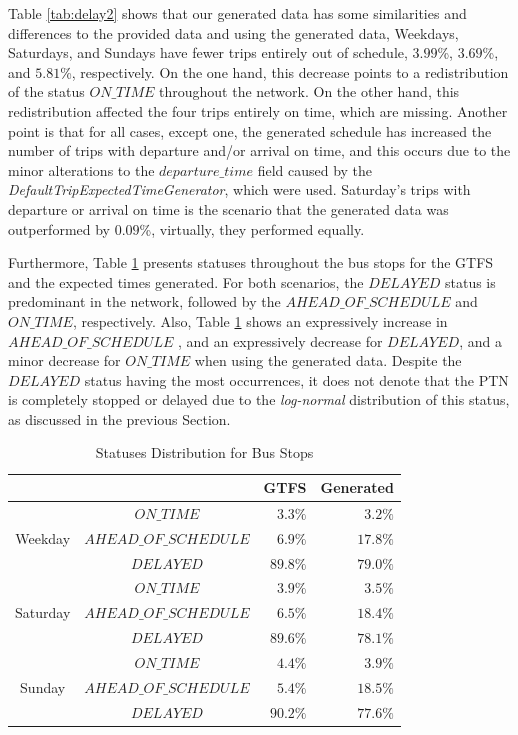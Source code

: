 Table \ref{tab:delay2} shows that our generated data has some similarities and differences to the provided data and
using the generated data, Weekdays, Saturdays, and Sundays have fewer trips entirely out of schedule, $3.99$\%, $3.69$\%, and
$5.81$\%, respectively. 
On the one hand, this decrease points to a redistribution of the status $ON\_TIME$ throughout the network. %
On the other hand, this redistribution affected the four trips entirely on time, which are missing. 
Another point is that for all cases, except one, the generated schedule has
increased the number of trips with departure and/or arrival on time, and this occurs due to the minor alterations to the 
$departure\_time$ field caused by the \textit{DefaultTripExpectedTimeGenerator}, which were used. 
Saturday's trips with departure or arrival on time is the scenario that the generated data was outperformed by $0.09$\%,
virtually, they performed equally. 

Furthermore, Table \ref{tab:delaydistribution} presents statuses throughout the bus stops for the GTFS and the expected times
generated. For both scenarios, the $DELAYED$ status is predominant in the network, followed by the $AHEAD\_OF\_SCHEDULE$ and
$ON\_TIME$, respectively. Also, Table \ref{tab:delaydistribution} shows an expressively increase in $AHEAD\_OF\_SCHEDULE$
, and an expressively decrease for $DELAYED$, and a minor decrease for $ON\_TIME$ when using the generated data. 
Despite the $DELAYED$ status having the most occurrences, it does not denote that the PTN is completely stopped or delayed due to the
{\em log-normal} distribution of this status, as discussed in the previous Section.

\begin{table}[h!]
\centering
\caption{Statuses Distribution for Bus Stops}
\begin{tabular}{|c|c|c|r|r|}
\hline
\multicolumn{3}{|c|}{} &   GTFS  &  Generated  \\
\hline
 \multirow{3}{*}{Weekday} & \multicolumn{2}{|c|}{$ON\_TIME$} & $3.3\%$ & $3.2\%$ \\\cline{2-5}
 & \multicolumn{2}{|c|}{$AHEAD\_OF\_SCHEDULE$} & $6.9\%$ & $17.8\%$ \\\cline{2-5}
 & \multicolumn{2}{|c|}{$DELAYED$} &$89.8\%$ & $79.0\%$  \\
\hline
 \multirow{3}{*}{Saturday} & \multicolumn{2}{|c|}{$ON\_TIME$} & $3.9\%$ & $3.5\%$ \\\cline{2-5}
 & \multicolumn{2}{|c|}{$AHEAD\_OF\_SCHEDULE$} & $6.5\%$ & $18.4\%$ \\\cline{2-5}
 & \multicolumn{2}{|c|}{$DELAYED$} &$89.6\%$ & $78.1\%$  \\
\hline
 \multirow{3}{*}{Sunday} & \multicolumn{2}{|c|}{$ON\_TIME$} & $4.4\%$ & $3.9\%$ \\\cline{2-5}
 & \multicolumn{2}{|c|}{$AHEAD\_OF\_SCHEDULE$} & $5.4\%$ & $18.5\%$ \\\cline{2-5}
 & \multicolumn{2}{|c|}{$DELAYED$} &$90.2\%$ & $77.6\%$  \\
\hline
\end{tabular}
\label{tab:delaydistribution}
\end{table}


